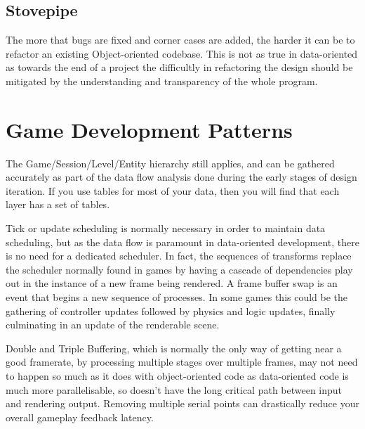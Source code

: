 \subsection{Stovepipe}

The more that bugs are fixed and corner cases are added, the harder it can be
to refactor an existing Object-oriented codebase. This is not as true in
data-oriented as towards the end of a project the difficultly in refactoring
the design should be mitigated by the understanding and transparency of the
whole program.

\section{Game Development Patterns}

The Game/Session/Level/Entity hierarchy still applies, and can be gathered
accurately as part of the data flow analysis done during the early stages of
design iteration. If you use tables for most of your data, then you will find
that each layer has a set of tables.

Tick or update scheduling is normally necessary in order to maintain data
scheduling, but as the data flow is paramount in data-oriented development,
there is no need for a dedicated scheduler. In fact, the sequences of
transforms replace the scheduler normally found in games by having a cascade of
dependencies play out in the instance of a new frame being rendered. A frame
buffer swap is an event that begins a new sequence of processes. In some games
this could be the gathering of controller updates followed by physics and logic
updates, finally culminating in an update of the renderable scene.

Double and Triple Buffering, which is normally the only way of getting near a
good framerate, by processing multiple stages over multiple frames, may not
need to happen so much as it does with object-oriented code as data-oriented
code is much more parallelisable, so doesn't have the long critical path
between input and rendering output. Removing multiple serial points can
drastically reduce your overall gameplay feedback latency.


